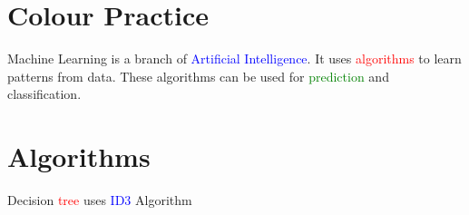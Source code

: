 \documentclass{article}
\begin{document}
	
	\section{Colour Practice}
	
%
	
	Machine Learning is a branch of
	\textcolor{blue}{Artificial Intelligence}.
	It uses \textcolor{red}{algorithms} to learn patterns from data.
	These algorithms can be used for
	\textcolor{green}{prediction} and classification.
	\section{Algorithms}
	Decision \textcolor{red}{tree} uses \textcolor{blue}{ID3} Algorithm
\end{document}

